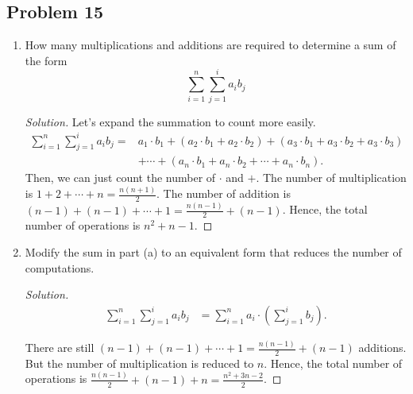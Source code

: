 \documentclass{article}
\begin{document}
\subsection*{Problem 15}
\begin{enumerate}[label=\alph*.]
    \item How many multiplications and additions are required to determine a sum of the form
    $$\sum_{i=1}^{n}\sum_{j=1}^{i}a_ib_j$$

    \begin{proof}[Solution]
        Let's expand the summation to count more easily.
        \begin{align*}
            \sum_{i=1}^{n}\sum_{j=1}^{i}a_ib_j = & a_1\cdot b_1 + (a_2\cdot b_1 + a_2\cdot b_2) + 
            (a_3\cdot b_1 + a_3\cdot b_2 + a_3\cdot b_3) \\ 
            & + \cdots + (a_n\cdot b_1 + a_n\cdot b_2 + \cdots + a_n\cdot b_n).
        \end{align*}
        Then, we can just count the number of $\cdot$ and $+$. The number of multiplication is 
        $1 + 2 + \cdots + n = \frac{n(n+1)}{2}$. The number of addition is $(n-1) + (n-1) + \cdots 
        + 1 = \frac{n(n-1)}{2} + (n-1)$. Hence, the total number of operations is $n^2+n-1$.
    \end{proof}

    \item Modify the sum in part (a) to an equivalent form that reduces the number of computations.
    \begin{proof}[Solution]
        \begin{align*}
            \sum_{i=1}^{n}\sum_{j=1}^{i}a_ib_j & = \sum_{i=1}^{n}a_i \cdot \left(\sum_{j=1}^{i}b_j\right).
        \end{align*}

        There are still $(n-1) + (n-1) + \cdots + 1 = \frac{n(n-1)}{2}+(n-1)$ additions. But the
        number of multiplication is reduced to $n$. Hence, the total number of operations is 
        $\frac{n(n-1)}{2} + (n-1) + n = \frac{n^2+3n-2}{2}$.
    \end{proof}
\end{enumerate}
\end{document}
